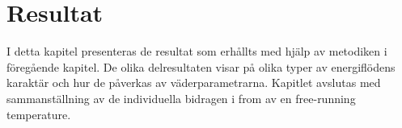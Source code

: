 \chapter{Resultat}

I detta kapitel presenteras de resultat som erhållts med hjälp av metodiken i föregående kapitel. De olika delresultaten visar på olika typer av energiflödens karaktär och hur de påverkas av väderparametrarna. Kapitlet avslutas med sammanställning av de individuella bidragen i from av en free-running temperature.






